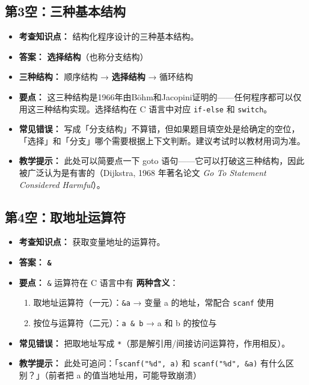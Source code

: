 \subsection{第3空：三种基本结构}

\begin{itemize}
    \item \textbf{考查知识点：} 结构化程序设计的三种基本结构。
    \item \textbf{答案：} \textbf{选择结构}（也称分支结构）
    \item \textbf{三种结构：} 顺序结构 → \textbf{选择结构} → 循环结构
    \item \textbf{要点：} 这三种结构是1966年由Böhm和Jacopini证明的——任何程序都可以仅用这三种结构实现。选择结构在 C 语言中对应 \texttt{if-else} 和 \texttt{switch}。
    \item \textbf{常见错误：} 写成「分支结构」不算错，但如果题目填空处是给确定的空位，「选择」和「分支」哪个需要根据上下文判断。建议考试时以教材用词为准。
    \item \textbf{教学提示：} 此处可以简要点一下 goto 语句——它可以打破这三种结构，因此被广泛认为是有害的（Dijkstra, 1968 年著名论文 \textit{Go To Statement Considered Harmful}）。
\end{itemize}

\subsection{第4空：取地址运算符}

\begin{itemize}
    \item \textbf{考查知识点：} 获取变量地址的运算符。
    \item \textbf{答案：} \texttt{\textbf{\&}}
    \item \textbf{要点：} \texttt{\&} 运算符在 C 语言中有 \textbf{两种含义}：
    \begin{enumerate}
        \item 取地址运算符（一元）：\texttt{\&a} → 变量 a 的地址，常配合 \texttt{scanf} 使用
        \item 按位与运算符（二元）：\texttt{a \& b} → a 和 b 的按位与
    \end{enumerate}
    \item \textbf{常见错误：} 把取地址写成 \texttt{*}（那是解引用/间接访问运算符，作用相反）。
    \item \textbf{教学提示：} 此处可追问：「\texttt{scanf("\%d", a)} 和 \texttt{scanf("\%d", \&a)} 有什么区别？」（前者把 a 的值当地址用，可能导致崩溃）
\end{itemize}

